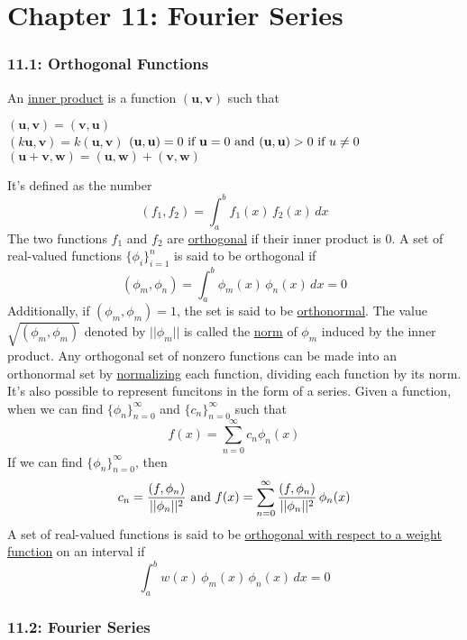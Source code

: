 \documentclass{article}
\begin{document}
\part*{Chapter 11: Fourier Series}
\section*{11.1: Orthogonal Functions}
An \underline{inner product} is a function \((\textbf{u},\textbf{v})\) such that
\begin{center}
\begin{multicols}{2}
    \((\textbf{u},\textbf{v})=(\textbf{v},\textbf{u})\)\\
    \((k\textbf{u},\textbf{v})=k(\textbf{u},\textbf{v})\)
    \((\textbf{u},\textbf{u})=0\textnormal{ if }\textbf{u}=0\textnormal{ and }(\textbf{u},\textbf{u})>0\textnormal{ if }u\neq 0\)
    \((\textbf{u}+\textbf{v},\textbf{w})=(\textbf{u},\textbf{w})+(\textbf{v},\textbf{w})\)
\end{multicols}
\end{center}
It's defined as the number
\[(f_1, f_2)=\int_a^bf_1(x)\,f_2(x)\,dx\]
The two functions \(f_1\) and \(f_2\) are \underline{orthogonal} if their inner product is 0. A set of real-valued functions \(\{\phi_i\}_{i=1}^n\) is said to be orthogonal if
\[(\phi_m,\phi_n)=\int_a^b\phi_m(x)\,\phi_n(x)\,dx=0\]
Additionally, if \((\phi_m, \phi_m)=1\), the set is said to be \underline{orthonormal}. The value \(\sqrt{(\phi_m,\phi_m)}\) denoted by \(||\phi_m||\) is called the \underline{norm} of \(\phi_m\) induced by the inner product. Any orthogonal set of nonzero functions can be made into an orthonormal set by \underline{normalizing} each function, dividing each function by its norm. It's also possible to represent funcitons in the form of a series. Given a function, when we can find \(\{\phi_n\}_{n=0}^\infty\) and \(\{c_n\}_{n=0}^\infty\) such that
\[f(x)=\sum_{n=0}^\infty c_n\phi_n(x)\]
If we can find \(\{\phi_n\}_{n=0}^\infty\), then
\[c_n=\frac{(f, \phi_n)}{||\phi_n||^2}\textnormal{ and }f(x)=\sum_{n=0}^\infty\frac{(f, \phi_n)}{||\phi_n||^2}\,\phi_n(x)\]
A set of real-valued functions is said to be \underline{orthogonal with respect to a weight function} on an interval if
\[\int_a^bw(x)\,\phi_m(x)\,\phi_n(x)\,dx=0\]
\section*{11.2: Fourier Series}
\end{document}
